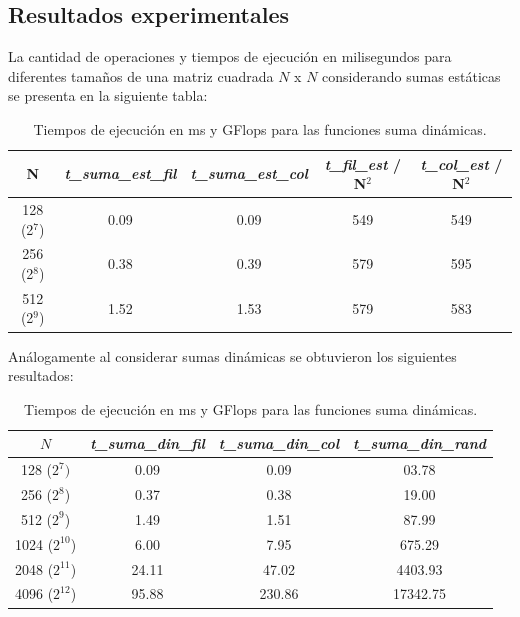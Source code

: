 \documentclass[11pt]{article}
\begin{document}
\subsection*{Resultados experimentales}
La cantidad de operaciones y tiempos de ejecución en milisegundos para diferentes tamaños  de una matriz cuadrada $N$ x $N$ considerando sumas estáticas se presenta en la siguiente tabla:
\begin{table}[h!]
    \centering
    \begin{tabular}{||c|c|c|c|c||}
    \hline       
         N        & \emph{ t\_suma\_est\_fil}  & \emph{t\_suma\_est\_col} & \emph{t\_fil\_est} / N$^2$ & \emph{t\_col\_est} / N$^2$ \\\hline\hline
     128 (2$^7$)    &    0.09                    &          0.09    &   549     & 549     \\
     256 (2$^8$)    &    0.38                    &          0.39    &   579     & 595     \\
     512 (2$^9$)    &    1.52                    &          1.53    &   579     & 583      \\
     \hline
    \end{tabular}
    \caption{Tiempos de ejecución en ms y GFlops para las funciones suma dinámicas. }
    \label{Tab:Ej1:sum:est}
\end{table}

Análogamente al considerar sumas dinámicas se obtuvieron los siguientes resultados:

\begin{table}[h!]
    \centering
    \begin{tabular}{||c|c|c|c||}
        \hline
         $N$   & \emph{t\_suma\_din\_fil}  & \emph{t\_suma\_din\_col} & \emph{t\_suma\_din\_rand} \\[0.5ex]  \hline\hline
        128 ($2^{7})$      & 0.09         & 0.09         & 03.78        \\
        256 ($2^{8}$)     & 0.37         & 0.38         & 19.00        \\
        512 ($2^{9}$)     & 1.49         & 1.51         & 87.99        \\
        1024 ($2^{10}$)   & 6.00         & 7.95         & 675.29       \\
        2048 ($2^{11}$)   & 24.11        & 47.02         & 4403.93      \\
        4096 ($2^{12}$)   & 95.88        & 230.86         & 17342.75    \\ 
        \hline
    \end{tabular}
    \caption{Tiempos de ejecución en ms y GFlops para las funciones suma dinámicas. }
    \label{Tab:Ej1:sum:din}
\end{table}
\end{document}
